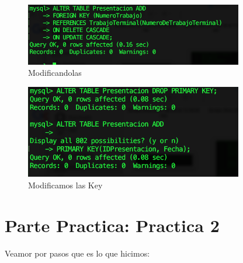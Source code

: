 \documentclass[12pt, fleqn]{article}                             %
\begin{document}
        \begin{figure}[h]
            \centering
            \includegraphics[width=0.85\textwidth]{BD1Reporte8}
            \caption{Modificandolas}
        \end{figure}

        \clearpage

        \begin{figure}[h!]
            \centering
            \includegraphics[width=0.85\textwidth]{BD1Reporte9}
            \caption{Modificamos las Key}
        \end{figure}







\clearpage
\section{Parte Practica: Practica 2}

    Veamor por pasos que es lo que hicimos:
\end{document}
